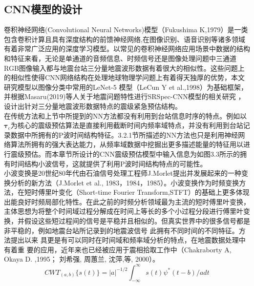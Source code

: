 \subsection{CNN模型的设计}
\indent 卷积神经网络(Convolutional Neural Networks)模型（Fukushima K,1979）是一类包含卷积计算且具有深度结构的前馈神经网络,在图像识别、语音识别等诸多领域有着非常广泛应用的深度学习模型。以常见的卷积神经网络应用场景中数据的结构和特征来看，无论是单通道的音频信息、时频信号还是图像处理问题中三通道RGB图像输入都与地震台站三分量地震波形数据有着很大的相似性。这些问题上的相似性使得CNN网络结构在处理地球物理学问题上有着得天独厚的优势，本文研究模型以图像分类中常用的LeNet-5 模型（LeCun Y et al.,1998）为基础框架，并根据Masaru(2019)等人关于地震问题特性进行SRSpec-CNN模型的相关研究 ，设计出针对三分量地震波形数据特点的震级紧急预估结构。\\
\indent 在传统方法和上节中所提到的NN方法都没有利用到台站信息时序的特点。例如以$\mathbf{\tau}_{\mathrm{c}}$为核心的震级预估算法是直接利用截断时间内频率域特点，并没有利用到台站记录数据中所拥有的P波时间结构特征。3.2.1节所描述的NN方法也只是利用神经网络算法所拥有的强大表达能力，从频率域数据中挖掘出更多描述能量的特征用以进行震级预估。而本章节所设计的CNN震级预估模型中输入信息为如图3.3所示的拥有时间结构小波信号，这就提供了利用P波时间结构特点的可能性。\\
\indent 小波变换是20世纪80年代由石油信号处理工程师J.Morlet提出并发展起来的一种变换分析的新方法（J.Morlet et al., 1983，1984，1985）。小波变换作为时频变换方法，在短时傅里叶变化（Short-time Fourier Transform,STFT）的基础上更多体现出能良好时频局部化特性。在此之前的时频分析领域最为主流的短时傅里叶变换，主体思想为将整个时间域过程分解成在时间上等长的多个小过程分段进行傅里叶变换，并假设这些短过程间的信号是平稳并且相似的。但真实世界中的很多信号都是非平稳的，例如地震台站所记录到的地震波信号
此拥有不同时间的不同特征。方法提出以来
具更是有可以同时在时间域和频率域分析的特点，在地震数据处理中有着重
要的应用，近年来也已经被应用于震相拾取工作中（Chakraborty A, Okaya D. ,1995；
刘希强, 周蕙兰, 沈萍,等, 2000）。
\begin{equation}
C W T_{(a, b)}\{s(t)\}=|a|^{-1 / 2} \int_{-\infty}^{\infty} s(t) \psi^{*}(t-b) / a d t
\end{equation}



